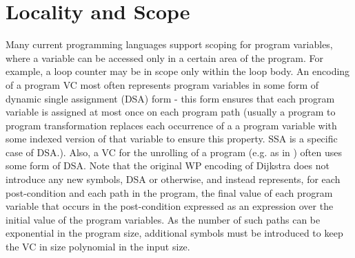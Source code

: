 \section{Locality and Scope}
Many current programming languages support scoping for program variables, where a variable can be accessed only in a certain area of the program. For example, a loop counter may be in scope only within the loop body.
An encoding of a program VC most often represents program variables in some form of dynamic single assignment (DSA) form - this form ensures that each program variable is assigned at most once on each program path (usually a program to program transformation replaces each occurrence of a a program variable with some indexed version of that variable to ensure this property. SSA is a specific case of DSA.). Also, a VC for the unrolling of a program (e.g. as in \cite{DBLP:conf/tacas/AlbarghouthiGC12}) often uses some form of DSA. 
Note that the original WP encoding of Dijkstra does not introduce any new symbols, DSA or otherwise, and instead represents, for each post-condition and each path in the program, the final value of each program variable that occurs in the post-condition expressed as an expression over the initial value of the program variables. 
As the number of such paths can be exponential in the program size, additional symbols must be introduced to keep the VC in size polynomial in the input size.


